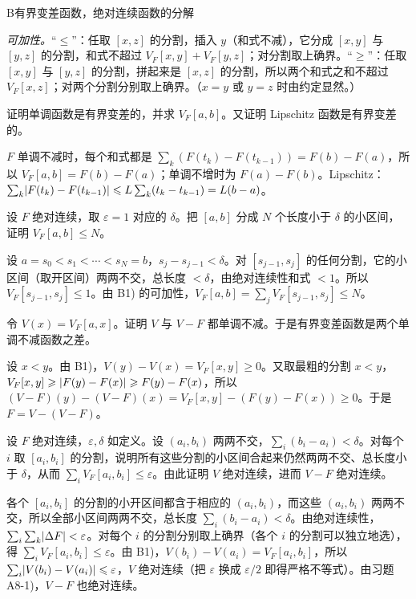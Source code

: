\begin{probleme}{B}{有界变差函数，绝对连续函数的分解}
\begin{questions}
\begin{solution}
\emph{可加性。}“$\leqslant$”：任取 $[x,z]$ 的分割，插入 $y$（和式不减），它分成 $[x,y]$ 与 $[y,z]$ 的分割，和式不超过 $V_F[x,y]+V_F[y,z]$；对分割取上确界。“$\geqslant$”：任取 $[x,y]$ 与 $[y,z]$ 的分割，拼起来是 $[x,z]$ 的分割，所以两个和式之和不超过 $V_F[x,z]$；对两个分割分别取上确界。（$x=y$ 或 $y=z$ 时由约定显然。）
\end{solution}
\item 证明单调函数是有界变差的，并求 $V_F[a,b]$。又证明 Lipschitz 函数是有界变差的。
\begin{solution}
$F$ 单调不减时，每个和式都是 $\sum_k(F(t_k)-F(t_{k-1}))=F(b)-F(a)$，所以 $V_F[a,b]=F(b)-F(a)$；单调不增时为 $F(a)-F(b)$。Lipschitz：$\sum_k\lvert F(t_k)-F(t_{k-1})\rvert\leqslant L\sum_k(t_k-t_{k-1})=L(b-a)$。
\end{solution}
\item 设 $F$ 绝对连续，取 $\varepsilon=1$ 对应的 $\delta$。把 $[a,b]$ 分成 $N$ 个长度小于 $\delta$ 的小区间，证明 $V_F[a,b]\leqslant N$。
\begin{solution}
设 $a=s_0<s_1<\cdots<s_N=b$，$s_j-s_{j-1}<\delta$。对 $[s_{j-1},s_j]$ 的任何分割，它的小区间（取开区间）两两不交，总长度 $<\delta$，由绝对连续性和式 $<1$。所以 $V_F[s_{j-1},s_j]\leqslant1$。由 B1) 的可加性，$V_F[a,b]=\sum_jV_F[s_{j-1},s_j]\leqslant N$。
\end{solution}
\item 令 $V(x)=V_F[a,x]$。证明 $V$ 与 $V-F$ 都单调不减。于是有界变差函数是两个单调不减函数之差。
\begin{solution}
设 $x<y$。由 B1)，$V(y)-V(x)=V_F[x,y]\geqslant0$。又取最粗的分割 $x<y$，$V_F[x,y]\geqslant\lvert F(y)-F(x)\rvert\geqslant F(y)-F(x)$，所以 $(V-F)(y)-(V-F)(x)=V_F[x,y]-(F(y)-F(x))\geqslant0$。于是 $F=V-(V-F)$。
\end{solution}
\item 设 $F$ 绝对连续，$\varepsilon,\delta$ 如定义。设 $(a_i,b_i)$ 两两不交，$\sum_i(b_i-a_i)<\delta$。对每个 $i$ 取 $[a_i,b_i]$ 的分割，说明所有这些分割的小区间合起来仍然两两不交、总长度小于 $\delta$，从而 $\sum_iV_F[a_i,b_i]\leqslant\varepsilon$。由此证明 $V$ 绝对连续，进而 $V-F$ 绝对连续。
\begin{solution}
各个 $[a_i,b_i]$ 的分割的小开区间都含于相应的 $(a_i,b_i)$，而这些 $(a_i,b_i)$ 两两不交，所以全部小区间两两不交，总长度 $\sum_i(b_i-a_i)<\delta$。由绝对连续性，$\sum_i\sum_k\lvert \Delta F\rvert<\varepsilon$。对每个 $i$ 的分割分别取上确界（各个 $i$ 的分割可以独立地选），得 $\sum_iV_F[a_i,b_i]\leqslant\varepsilon$。由 B1)，$V(b_i)-V(a_i)=V_F[a_i,b_i]$，所以 $\sum_i\lvert V(b_i)-V(a_i)\rvert\leqslant\varepsilon$，$V$ 绝对连续（把 $\varepsilon$ 换成 $\varepsilon/2$ 即得严格不等式）。由习题 A8-1)，$V-F$ 也绝对连续。

\end{solution}
\end{questions}
\end{probleme}
